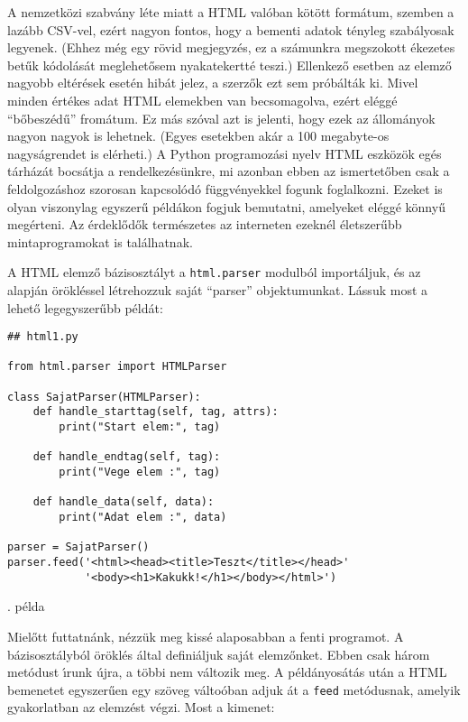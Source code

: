 A nemzetk\"ozi szabv\'any l\'ete miatt a HTML val\'oban k\"ot\"ott form\'atum, szemben a laz\'abb CSV-vel, 
ez\'ert nagyon fontos, hogy a bementi adatok t\'enyleg szab\'alyosak legyenek. (Ehhez m\'eg egy r\"ovid 
megjegyz\'es, ez a sz\'amunkra megszokott \'ekezetes bet\H{u}k k\'odol\'as\'at meglehet\H{o}sem nyakatekertt\'e 
teszi.) Ellenkez\H{o} esetben az elemz\H{o} nagyobb elt\'er\'esek eset\'en hib\'at jelez, a szerz\H{o}k 
ezt sem pr\'ob\'alt\'ak ki. Mivel minden \'ert\'ekes adat HTML elemekben van becsomagolva, ez\'ert 
el\'egg\'e ``b\H{o}besz\'ed\H{u}'' from\'atum. Ez m\'as sz\'oval azt is jelenti, hogy ezek az \'allom\'anyok 
nagyon nagyok is lehetnek. (Egyes esetekben ak\'ar a 100 megabyte-os nagys\'agrendet is el\'erheti.) A 
Python programoz\'asi nyelv HTML eszk\"oz\"ok eg\'es t\'arh\'az\'at bocs\'atja a rendelkez\'es\"unkre, 
mi azonban ebben az ismertet\H{o}ben csak a feldolgoz\'ashoz szorosan kapcsol\'od\'o f\"uggv\'enyekkel 
fogunk foglalkozni. Ezeket is olyan viszonylag egyszer\H{u} p\'eld\'akon fogjuk bemutatni, amelyeket 
el\'egg\'e k\"onny\H{u} meg\'erteni. Az \'erdekl\H{o}d\H{o}k term\'eszetes az interneten ezekn\'el 
\'eletszer\H{u}bb mintaprogramokat is tal\'alhatnak.

A HTML elemz\H{o} b\'azisoszt\'alyt a {\tt html.parser} modulb\'ol import\'aljuk, \'es az alapj\'an 
 \"or\"okl\'essel l\'etrehozzuk saj\'at ``parser'' objektumunkat. L\'assuk most a 
lehet\H{o} legegyszer\H{u}bb p\'eld\'at:

\incminta
\begin{Verbatim}[fontsize=\small]
## html1.py

from html.parser import HTMLParser

class SajatParser(HTMLParser):
    def handle_starttag(self, tag, attrs):
        print("Start elem:", tag)

    def handle_endtag(self, tag):
        print("Vege elem :", tag)

    def handle_data(self, data):
        print("Adat elem :", data)

parser = SajatParser()
parser.feed('<html><head><title>Teszt</title></head>'
            '<body><h1>Kakukk!</h1></body></html>')
\end{Verbatim}
\theminta. p\'elda

\noindent Miel\H{o}tt futtatn\'ank, n\'ezz\"uk meg kiss\'e alaposabban a fenti programot. A 
b\'a\-zis\-osz\-t\'aly\-b\'ol \"or\"okl\'es \'altal defini\'aljuk saj\'at elemz\H{o}nket. 
Ebben csak h\'arom met\'odust \'{\i}runk \'ujra, a t\"obbi nem v\'altozik meg. A 
p\'eld\'anyos\'at\'as ut\'an a HTML bemenetet egyszer\H{u}en egy sz\"oveg v\'alto\'oban 
adjuk \'at a {\tt feed} met\'odusnak, amelyik gyakorlatban az elemz\'est v\'egzi. Most a 
kimenet:

